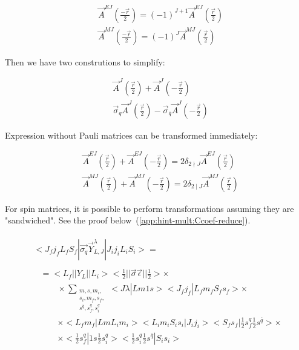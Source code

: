 \begin{align}
    &\vec{A}^{EJ}(\frac{-\vec{r}}{2}) = (-1)^{J+1} \vec{A}^{EJ}(\frac{\vec{r}}{2}) \\
    &\vec{A}^{MJ}(\frac{-\vec{r}}{2}) = (-1)^{J} \vec{A}^{MJ}(\frac{\vec{r}}{2})
\end{align}

Then we have two construtions to simplify:

\begin{align}
    &\vec{A}^{J}(\frac{\vec{r}}{2}) + \vec{A}^{J}(-\frac{\vec{r}}{2}) \\
    &\vec{\sigma}_{q} \vec{A}^{J}(\frac{\vec{r}}{2}) - \vec{\sigma}_{\overline{q}} \vec{A}^{J}(-\frac{\vec{r}}{2}) \label{eq:sigmaAJ}
\end{align}

Expression without Pauli matrices can be transformed immediately:

\begin{align}
    &\vec{A}^{EJ}(\frac{\vec{r}}{2}) + \vec{A}^{EJ}(-\frac{\vec{r}}{2}) = 2 \delta_{2 \nmid J} \vec{A}^{EJ}(\frac{\vec{r}}{2}) \\
    &\vec{A}^{MJ}(\frac{\vec{r}}{2}) + \vec{A}^{MJ}(-\frac{\vec{r}}{2}) = 2 \delta_{2 \mid J} \vec{A}^{MJ}(\frac{\vec{r}}{2})
\end{align}

For spin matrices, it is possible to perform transformations assuming they are "sandwiched". See the proof below~(\cref{app:hint-mult:Ccoef-reduce}).

\begin{align}
    \begin{split}
        <J_f j_f L_f S_f| \vec{\sigma_q} \vec{Y}_{L, J}^\lambda |J_i j_i L_i S_i> =
    \end{split} \\
    \begin{split}
        &= <L_f|| Y_L ||L_i> <\frac{1}{2}|| \vec{\sigma}\vec{\epsilon} ||\frac{1}{2}> \times \\
        &\qquad\times \sum_{\substack{m, s, m_i,\\ s_i, m_f, s_f, \\s^{\overline{q}}, s_{f}^{q}, s_i^q}} <J \lambda| L m 1 s> <J_f j_f| L_f m_f S_f s_f> \times \\
        &\qquad\times <L_f m_f| L m L_i m_i> <L_i m_i S_i s_i| J_i j_i> <S_f s_f| \frac{1}{2} s_f^{q} \frac{1}{2} s^{\overline{q}}> \times \\
        &\qquad\times <\frac{1}{2} s_f^q| 1 s \frac{1}{2} s_i^q> <\frac{1}{2} s_i^{q} \frac{1}{2} s^{\overline{q}} |S_i s_i>
    \end{split}
\end{align}

